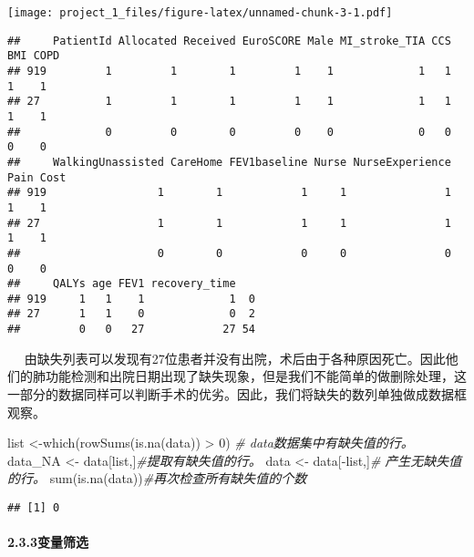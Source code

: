 \documentclass[
]{article}
\newenvironment{Shaded}{\begin{snugshade}}{\end{snugshade}}
\newcommand{\CommentTok}[1]{\textcolor[rgb]{0.56,0.35,0.01}{\textit{#1}}}
\newcommand{\DecValTok}[1]{\textcolor[rgb]{0.00,0.00,0.81}{#1}}
\newcommand{\FunctionTok}[1]{\textcolor[rgb]{0.00,0.00,0.00}{#1}}
\newcommand{\NormalTok}[1]{#1}
\newcommand{\OtherTok}[1]{\textcolor[rgb]{0.56,0.35,0.01}{#1}}
\newcommand{\SpecialCharTok}[1]{\textcolor[rgb]{0.00,0.00,0.00}{#1}}
\begin{document}
\texttt{[image: project\_1\_files/figure-latex/unnamed-chunk-3-1.pdf]}

\begin{verbatim}
##     PatientId Allocated Received EuroSCORE Male MI_stroke_TIA CCS BMI COPD
## 919         1         1        1         1    1             1   1   1    1
## 27          1         1        1         1    1             1   1   1    1
##             0         0        0         0    0             0   0   0    0
##     WalkingUnassisted CareHome FEV1baseline Nurse NurseExperience Pain Cost
## 919                 1        1            1     1               1    1    1
## 27                  1        1            1     1               1    1    1
##                     0        0            0     0               0    0    0
##     QALYs age FEV1 recovery_time   
## 919     1   1    1             1  0
## 27      1   1    0             0  2
##         0   0   27            27 54
\end{verbatim}

 
由缺失列表可以发现有27位患者并没有出院，术后由于各种原因死亡。因此他们的肺功能检测和出院日期出现了缺失现象，但是我们不能简单的做删除处理，这一部分的数据同样可以判断手术的优劣。因此，我们将缺失的数列单独做成数据框观察。

\begin{Shaded}
\begin{Highlighting}[]
\NormalTok{list }\OtherTok{\textless{}{-}}\FunctionTok{which}\NormalTok{(}\FunctionTok{rowSums}\NormalTok{(}\FunctionTok{is.na}\NormalTok{(data)) }\SpecialCharTok{\textgreater{}} \DecValTok{0}\NormalTok{) }\CommentTok{\# data数据集中有缺失值的行。}
\NormalTok{data\_NA }\OtherTok{\textless{}{-}}\NormalTok{ data[list,]}\CommentTok{\#提取有缺失值的行。}
\NormalTok{data }\OtherTok{\textless{}{-}}\NormalTok{ data[}\SpecialCharTok{{-}}\NormalTok{list,]}\CommentTok{\# 产生无缺失值的行。}
\FunctionTok{sum}\NormalTok{(}\FunctionTok{is.na}\NormalTok{(data))}\CommentTok{\#再次检查所有缺失值的个数}
\end{Highlighting}
\end{Shaded}

\begin{verbatim}
## [1] 0
\end{verbatim}

\hypertarget{ux53d8ux91cfux7b5bux9009}{%
\paragraph{2.3.3变量筛选}\label{ux53d8ux91cfux7b5bux9009}}
\end{document}
